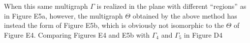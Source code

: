 When this same multigraph $\Gamma$ is realized in the plane with different “regions” as in Figure E5a, however, the multigraph $\Theta$ obtained by the above method has instead the form of Figure E5b, which is obviously not isomorphic to the $\Theta$ of Figure E4. Comparing Figures E4 and E5b with $\Gamma_4$ and $\Gamma_5$ in Figure D4
